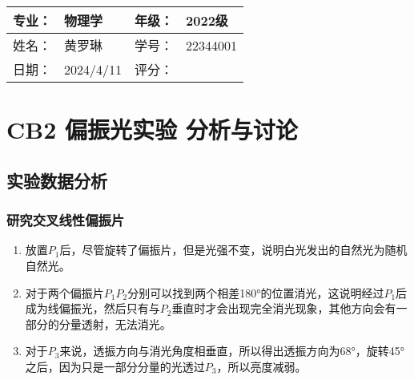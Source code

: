 \documentclass[dvipsnames, svgnames,a4paper,11pt]{article}
\begin{document}
	\clearpage
	
	\begin{table}
		\renewcommand\arraystretch{1.7}
		\begin{tabularx}{\textwidth}{|X|X|X|X|}
			\hline
			专业：& 物理学 &年级：& 2022级\\
			\hline
			姓名： & 黄罗琳 & 学号：&22344001 \\
			\hline
			日期：& 2024/4/11 & 评分： &\\
			\hline
		\end{tabularx}
	\end{table}
	
	\section{CB2 偏振光实验 \quad\heiti 分析与讨论}
	
	\subsection{实验数据分析}
	
	\subsubsection{研究交叉线性偏振片}
	\begin{enumerate}
		\item 放置$P_1$后，尽管旋转了偏振片，但是光强不变，说明白光发出的自然光为随机自然光。
		\item 对于两个偏振片$P_1$$P_2$分别可以找到两个相差180°的位置消光，这说明经过$P_1$后成为线偏振光，然后只有与$P_2$垂直时才会出现完全消光现象，其他方向会有一部分的分量透射，无法消光。
		\item 对于$P_3$来说，透振方向与消光角度相垂直，所以得出透振方向为68°，旋转45°之后，因为只是一部分分量的光透过$P_3$，所以亮度减弱。
	\end{enumerate}
\end{document}
